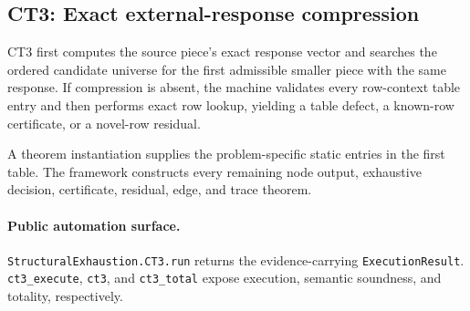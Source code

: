 \subsection{CT3: Exact external-response compression}
\label{sec:ct3-automation}

CT3 first computes the source piece's exact response vector and searches the ordered candidate universe for the first admissible smaller piece with the same response. If compression is absent, the machine validates every row-context table entry and then performs exact row lookup, yielding a table defect, a known-row certificate, or a novel-row residual.

A theorem instantiation supplies the problem-specific static entries in the first table. The framework constructs every remaining node output, exhaustive decision, certificate, residual, edge, and trace theorem.

\paragraph{Public automation surface.}
\texttt{StructuralExhaustion.CT3.run} returns the evidence-carrying \texttt{ExecutionResult}. \texttt{ct3\_\allowbreak{}execute}, \texttt{ct3}, and \texttt{ct3\_\allowbreak{}total} expose execution, semantic soundness, and totality, respectively.

